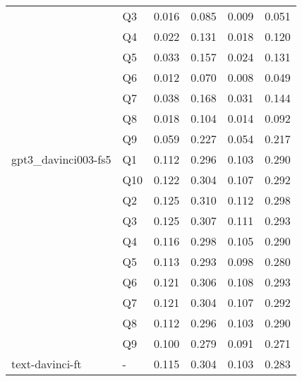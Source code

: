 \begin{tabular}{llrrrr}
                & Q3 & 0.016 & 0.085 & 0.009 & 0.051 \\
                & Q4 & 0.022 & 0.131 & 0.018 & 0.120 \\
                & Q5 & 0.033 & 0.157 & 0.024 & 0.131 \\
                & Q6 & 0.012 & 0.070 & 0.008 & 0.049 \\
                & Q7 & 0.038 & 0.168 & 0.031 & 0.144 \\
                & Q8 & 0.018 & 0.104 & 0.014 & 0.092 \\
                & Q9 & 0.059 & 0.227 & 0.054 & 0.217 \\
gpt3\_davinci003-fs5 & Q1 & 0.112 & 0.296 & 0.103 & 0.290 \\
                & Q10 & 0.122 & 0.304 & 0.107 & 0.292 \\
                & Q2 & 0.125 & 0.310 & 0.112 & 0.298 \\
                & Q3 & 0.125 & 0.307 & 0.111 & 0.293 \\
                & Q4 & 0.116 & 0.298 & 0.105 & 0.290 \\
                & Q5 & 0.113 & 0.293 & 0.098 & 0.280 \\
                & Q6 & 0.121 & 0.306 & 0.108 & 0.293 \\
                & Q7 & 0.121 & 0.304 & 0.107 & 0.292 \\
                & Q8 & 0.112 & 0.296 & 0.103 & 0.290 \\
                & Q9 & 0.100 & 0.279 & 0.091 & 0.271 \\
text-davinci-ft & - & 0.115 & 0.304 & 0.103 & 0.283 \\
\bottomrule
\end{tabular}
